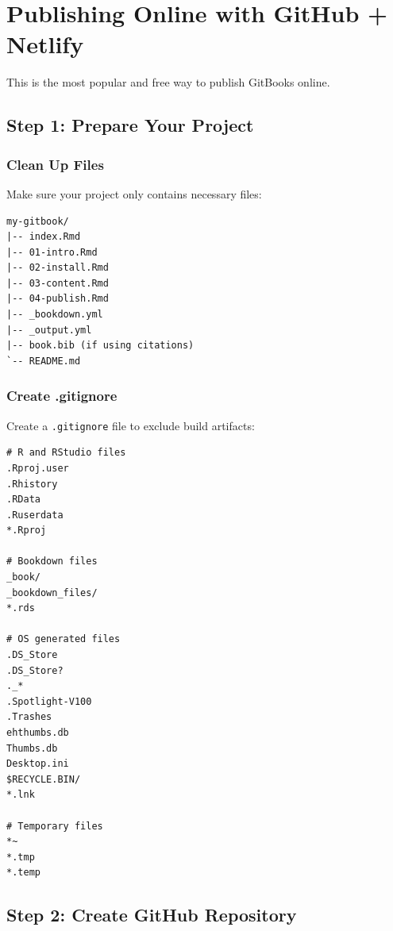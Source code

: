 \documentclass[
]{book}
\begin{document}
\section{Publishing Online with GitHub + Netlify}\label{publishing-online-with-github-netlify}

This is the most popular and free way to publish GitBooks online.

\subsection{Step 1: Prepare Your Project}\label{step-1-prepare-your-project}

\subsubsection{Clean Up Files}\label{clean-up-files}

Make sure your project only contains necessary files:

\begin{verbatim}
my-gitbook/
|-- index.Rmd
|-- 01-intro.Rmd
|-- 02-install.Rmd
|-- 03-content.Rmd
|-- 04-publish.Rmd
|-- _bookdown.yml
|-- _output.yml
|-- book.bib (if using citations)
`-- README.md
\end{verbatim}

\subsubsection{Create .gitignore}\label{create-.gitignore}

Create a \texttt{.gitignore} file to exclude build artifacts:

\begin{verbatim}
# R and RStudio files
.Rproj.user
.Rhistory
.RData
.Ruserdata
*.Rproj

# Bookdown files
_book/
_bookdown_files/
*.rds

# OS generated files
.DS_Store
.DS_Store?
._*
.Spotlight-V100
.Trashes
ehthumbs.db
Thumbs.db
Desktop.ini
$RECYCLE.BIN/
*.lnk

# Temporary files
*~
*.tmp
*.temp
\end{verbatim}

\subsection{Step 2: Create GitHub Repository}\label{step-2-create-github-repository}
\end{document}
